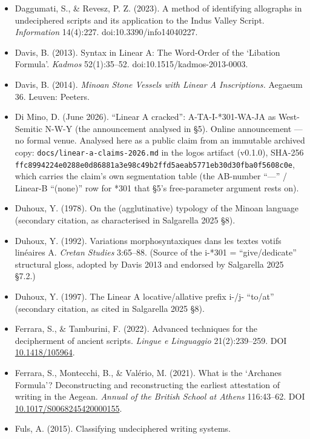\documentclass[
  10pt,
]{article}
\begin{document}
\begin{itemize}
{  International Database Applications \& Engineering Symposium (IDEAS)}.
\item
  Daggumati, S., \& Revesz, P. Z. (2023). A method of identifying
  allographs in undeciphered scripts and its application to the Indus
  Valley Script. \emph{Information} 14(4):227. doi:10.3390/info14040227.
\item
  Davis, B. (2013). Syntax in Linear A: The Word-Order of the `Libation
  Formula'. \emph{Kadmos} 52(1):35--52. doi:10.1515/kadmos-2013-0003.
\item
  Davis, B. (2014). \emph{Minoan Stone Vessels with Linear A
  Inscriptions.} Aegaeum 36. Leuven: Peeters.
\item
  Di Mino, D. (June 2026). ``Linear A cracked'': A-TA-I-*301-WA-JA as
  West-Semitic N-W-Y (the announcement analysed in §5). Online
  announcement --- no formal venue. Analysed here as a public claim from
  an immutable archived copy: \texttt{docs/linear-a-claims-2026.md} in
  the logos artifact (v0.1.0), SHA-256
  \texttt{ffc8994224e0288e0d86881a3e98c49b2ffd5aeab5771eb30d30fba0f5608c0e},
  which carries the claim's own segmentation table (the AB-number
  ``---'' / Linear-B ``(none)'' row for *301 that §5's free-parameter
  argument rests on).
\item
  Duhoux, Y. (1978). On the (agglutinative) typology of the Minoan
  language (secondary citation, as characterised in Salgarella 2025 §8).
\item
  Duhoux, Y. (1992). Variations morphosyntaxiques dans les textes votifs
  linéaires A. \emph{Cretan Studies} 3:65--88. (Source of the i-*301 =
  ``give/dedicate'' structural gloss, adopted by Davis 2013 and endorsed
  by Salgarella 2025 §7.2.)
\item
  Duhoux, Y. (1997). The Linear A locative/allative prefix i-/j-
  ``to/at'' (secondary citation, as cited in Salgarella 2025 §8).
\item
  Ferrara, S., \& Tamburini, F. (2022). Advanced techniques for the
  decipherment of ancient scripts. \emph{Lingue e Linguaggio}
  21(2):239--259. DOI
  \href{https://doi.org/10.1418/105964}{10.1418/105964}.
\item
  Ferrara, S., Montecchi, B., \& Valério, M. (2021). What is the
  `Archanes Formula'? Deconstructing and reconstructing the earliest
  attestation of writing in the Aegean. \emph{Annual of the British
  School at Athens} 116:43--62. DOI
  \href{https://doi.org/10.1017/S0068245420000155}{10.1017/S0068245420000155}.
\item
  Fuls, A. (2015). Classifying undeciphered writing systems.

\end{itemize}
\end{document}
